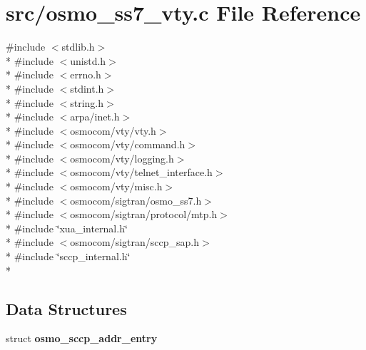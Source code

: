 \section{src/osmo\+\_\+ss7\+\_\+vty.c File Reference}
\label{osmo__ss7__vty_8c}
{\ttfamily \#include $<$stdlib.\+h$>$}\\*
{\ttfamily \#include $<$unistd.\+h$>$}\\*
{\ttfamily \#include $<$errno.\+h$>$}\\*
{\ttfamily \#include $<$stdint.\+h$>$}\\*
{\ttfamily \#include $<$string.\+h$>$}\\*
{\ttfamily \#include $<$arpa/inet.\+h$>$}\\*
{\ttfamily \#include $<$osmocom/vty/vty.\+h$>$}\\*
{\ttfamily \#include $<$osmocom/vty/command.\+h$>$}\\*
{\ttfamily \#include $<$osmocom/vty/logging.\+h$>$}\\*
{\ttfamily \#include $<$osmocom/vty/telnet\+\_\+interface.\+h$>$}\\*
{\ttfamily \#include $<$osmocom/vty/misc.\+h$>$}\\*
{\ttfamily \#include $<$osmocom/sigtran/osmo\+\_\+ss7.\+h$>$}\\*
{\ttfamily \#include $<$osmocom/sigtran/protocol/mtp.\+h$>$}\\*
{\ttfamily \#include \char`\"{}xua\+\_\+internal.\+h\char`\"{}}\\*
{\ttfamily \#include $<$osmocom/sigtran/sccp\+\_\+sap.\+h$>$}\\*
{\ttfamily \#include \char`\"{}sccp\+\_\+internal.\+h\char`\"{}}\\*
\subsection*{Data Structures}
\begin{DoxyCompactItemize}
\item 
struct {\bf osmo\+\_\+sccp\+\_\+addr\+\_\+entry}
\end{DoxyCompactItemize}
